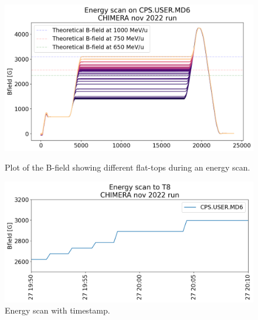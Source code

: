 \documentclass{cernatsnote}
\begin{document}
\begin{figure}[!htb]
    \centering
    \begin{minipage}{0.45\textwidth}
        \centering
        \includegraphics[width=1.0\textwidth]{images/PS_BEAM_ENERGY/energy_scan_chimera 1.png}
        \caption{Plot of the B-field showing different flat-tops during an energy scan.}
        \label{fig:energy_scan}
    \end{minipage}\hfill
    \begin{minipage}{0.45\textwidth}
        \centering
        \includegraphics[width=1.0\textwidth]{images/PS_BEAM_ENERGY/energy_scan_timestamp_chimera 1.png} 
        \caption{Energy scan with timestamp.}
        \label{fig:energy_scan_timestamp}
    \end{minipage}
\end{figure}
\end{document}
